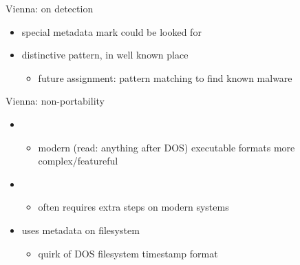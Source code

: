 \begin{frame}{Vienna: on detection}
    \begin{itemize}
    \item special metadata mark could be looked for
    \item distinctive pattern, in well known place
        \begin{itemize}
        \item future assignment: pattern matching to find known malware
        \end{itemize}
    \end{itemize}
\end{frame}

\begin{frame}{Vienna: non-portability}
    \begin{itemize}
    \item {}
        \begin{itemize}
        \item modern (read: anything after DOS) executable formats more complex/featureful
        \end{itemize}
    \item {}
        \begin{itemize}
        \item often requires extra steps on modern systems
        \end{itemize}
    \item uses metadata on filesystem
        \begin{itemize}
        \item quirk of DOS filesystem timestamp format
        \end{itemize}
    \end{itemize}
\end{frame}

